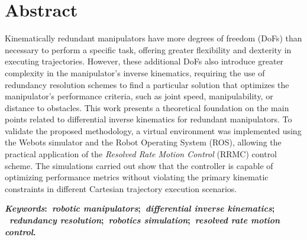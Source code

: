 \chapter*{Abstract}
\noindent Kinematically redundant manipulators have more degrees of freedom (DoFs) 
than necessary to perform a specific task, offering greater flexibility and dexterity 
in executing trajectories. However, these additional DoFs also introduce greater complexity 
in the manipulator's inverse kinematics, requiring the use of redundancy resolution schemes 
to find a particular solution that optimizes the manipulator's performance criteria, such as 
joint speed, manipulability, or distance to obstacles. This work presents a theoretical foundation
 on the main points related to differential inverse kinematics for redundant manipulators. To 
 validate the proposed methodology, a virtual environment was implemented using the Webots simulator 
 and the Robot Operating System (ROS), allowing the practical application of the \emph{Resolved Rate Motion Control} 
 (RRMC) control scheme. The simulations carried out show that the controller is capable of optimizing 
 performance metrics without violating the primary kinematic constraints in different Cartesian trajectory 
 execution scenarios.

  \vspace{5mm}

\noindent\textbf{
    \textit{Keywords}:~\textit{robotic manipulators};~\textit{differential inverse kinematics};
    ~\textit{redundancy resolution};~\textit{robotics simulation};~\textit{resolved rate motion control}.
}
